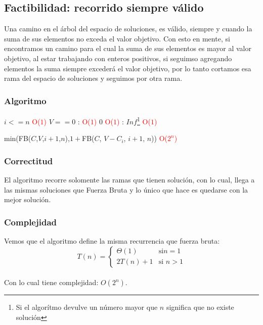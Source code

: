 \subsection{Factibilidad: recorrido siempre v\'alido}
Una camino en el \'arbol del espacio de soluciones, es v\'alido, siempre y cuando la suma de sus elementos no exceda el valor objetivo.
Con esto en mente, si encontramos un camino para el cual la suma de sus elementos es mayor al valor objetivo, al estar trabajando con enteros positivos, si seguimso agregando elementos la suma siempre exceder\'a el valor objetivo, por lo tanto cortamos esa rama del espacio de soluciones y seguimos por otra rama.\\

\subsubsection{Algoritmo}
\begin{codebox}
    \li \If $i <= n$ \quad\quad\quad\quad\quad\quad\quad\textcolor{red}{O($1$)}
        \Then
    \li        \If $V == 0$ : \quad\quad\quad\quad\quad\quad\textcolor{red}{O($1$)}
                \Then
    \li             \Return $0$ \quad\quad\quad\quad\quad\quad\quad\textcolor{red}{O($1$)}
    \li         \Else: 
    \li                 \Return $Inf$\footnote{Si el algor\'itmo devulve un n\'umero mayor que $n$ significa que no existe soluci\'on} \quad\quad\quad\quad\quad\quad\quad\textcolor{red}{O($1$)}
                \End
                \End

    \li \Return min(FB($C$,$V$,$i+1$,$n$),$1 +$FB($C$, $V-C_{i}$, $i+1$, $n$)) \textcolor{red}{O($2^n$)}

    \end{codebox}
\subsubsection{Correctitud}
El algoritmo recorre solomente las ramas que tienen soluci\'on, con lo cual, llega a las mismas soluciones que Fuerza Bruta y lo \'unico que hace es quedarse con la mejor soluci\'on.
\subsubsection{Complejidad}
Vemos que el algoritmo define la misma recurrencia que fuerza bruta:\\
$$
T(n) = \left\{
\begin{array}{cl}
 \Theta (1) &\mbox{si
} n = 1 \\
2T(n)+1&\mbox{si } n > 1
\end{array}\right.
$$
\\
Con lo cual tiene complejidad: $O(2^{n})$.\\
\newpage

